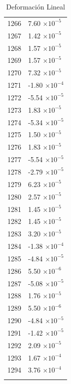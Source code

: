 \documentclass[a4paper,11pt]{article}
\begin{document}
\begin{center}
\begin{longtable}{|R{1.5cm}|R{2.5cm}|}
 1266 &         7.60 $\times 10^{          -5}$ \\
 1267 &         1.42 $\times 10^{          -5}$ \\
 1268 &         1.57 $\times 10^{          -5}$ \\
 1269 &         1.57 $\times 10^{          -5}$ \\
 1270 &         7.32 $\times 10^{          -5}$ \\
 1271 &        -1.80 $\times 10^{          -4}$ \\
 1272 &        -5.54 $\times 10^{          -5}$ \\
 1273 &         1.83 $\times 10^{          -5}$ \\
 1274 &        -5.34 $\times 10^{          -5}$ \\
 1275 &         1.50 $\times 10^{          -5}$ \\
 1276 &         1.83 $\times 10^{          -5}$ \\
 1277 &        -5.54 $\times 10^{          -5}$ \\
 1278 &        -2.79 $\times 10^{          -5}$ \\
 1279 &         6.23 $\times 10^{          -5}$ \\
 1280 &         2.57 $\times 10^{          -5}$ \\
 1281 &         1.45 $\times 10^{          -5}$ \\
 1282 &         1.45 $\times 10^{          -5}$ \\
 1283 &         3.20 $\times 10^{          -5}$ \\
 1284 &        -1.38 $\times 10^{          -4}$ \\
 1285 &        -4.84 $\times 10^{          -5}$ \\
 1286 &         5.50 $\times 10^{          -6}$ \\
 1287 &        -5.08 $\times 10^{          -5}$ \\
 1288 &         1.76 $\times 10^{          -5}$ \\
 1289 &         5.50 $\times 10^{          -6}$ \\
 1290 &        -4.84 $\times 10^{          -5}$ \\
 1291 &        -1.42 $\times 10^{          -5}$ \\
 1292 &         2.09 $\times 10^{          -5}$ \\
 1293 &         1.67 $\times 10^{          -4}$ \\
 1294 &         3.76 $\times 10^{          -4}$ \\
\bottomrule[0.8mm]                               
\caption{Deformación Lineal}             
\end{longtable}                                  
\end{center}                                     
\end{document}
